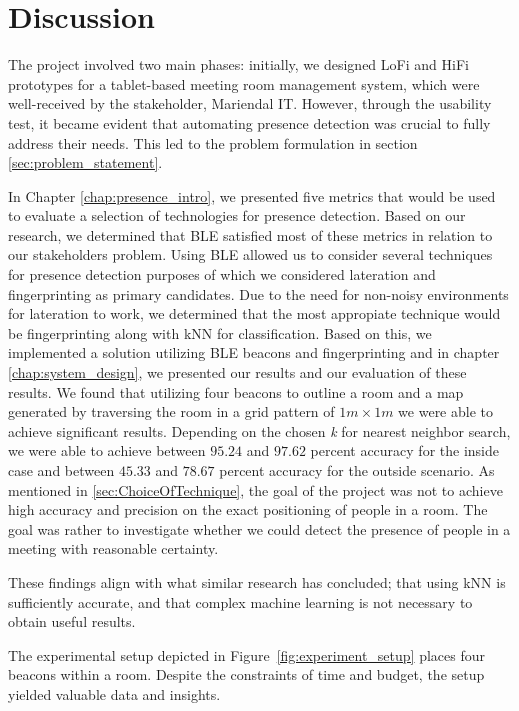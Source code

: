 \chapter{Discussion}\label{chap:discussion}
The project involved two main phases: initially, we designed LoFi and HiFi prototypes for a tablet-based meeting room management system, which were well-received by the stakeholder, Mariendal IT.
However, through the usability test, it became evident that automating presence detection was crucial to fully address their needs.
This led to the problem formulation in section \ref{sec:problem_statement}.

In Chapter \ref{chap:presence_intro}, we presented five metrics that would be used to evaluate a selection of technologies for presence detection.
Based on our research, we determined that BLE satisfied most of these metrics in relation to our stakeholders problem.
Using BLE allowed us to consider several techniques for presence detection purposes of which we considered lateration and fingerprinting as primary candidates.
Due to the need for non-noisy environments for lateration to work, we determined that the most appropiate technique would be fingerprinting along with kNN for classification.
Based on this, we implemented a solution utilizing BLE beacons and fingerprinting and in chapter \ref{chap:system_design}, we presented our results and our evaluation of these results. 
We found that utilizing four beacons to outline a room and a map generated by traversing the room in a grid pattern of $1m \times 1m$ we were able to achieve significant results.
Depending on the chosen \textit{k} for nearest neighbor search, we were able to achieve between $95.24$ and $97.62$ percent accuracy for the inside case and between $45.33$ and $78.67$ percent accuracy for the outside scenario. 
As mentioned in \ref{sec:ChoiceOfTechnique}, the goal of the project was not to achieve high accuracy and precision on the exact positioning of people in a room. 
The goal was rather to investigate whether we could detect the presence of people in a meeting with reasonable certainty.

These findings align with what similar research has concluded; that using kNN is sufficiently accurate, and that complex machine learning is not necessary to obtain useful results.\cite{ble_kneares_neural}

The experimental setup depicted in Figure~\ref{fig:experiment_setup} places four beacons within a room.
Despite the constraints of time and budget, the setup yielded valuable data and insights.

